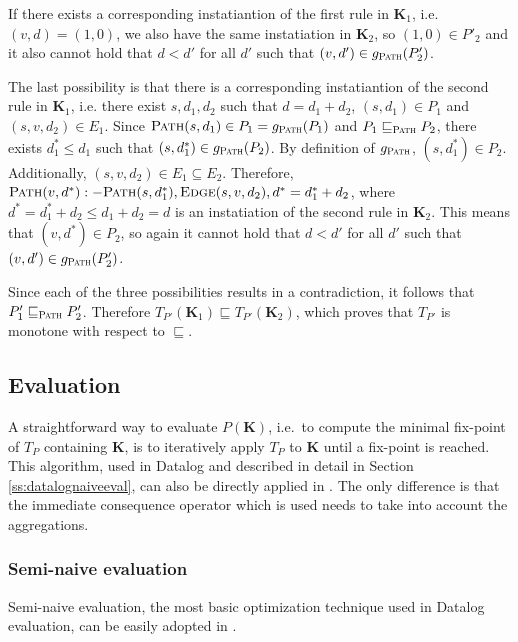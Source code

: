 \begin{exmp}
\begin{prof}
If there exists a corresponding instatiantion of the first rule in $\textbf{K}_1$, i.e. $(v, d) = (1, 0)$, we also have the same instatiation in $\textbf{K}_2$, so $(1, 0) \in P'_2$ and it also cannot hold that $d < d'$ for all $d'$ such that $(v, d') \in g_\textsc{Path}(P'_2)$.

The last possibility is that there is a corresponding instatiantion of the second rule in $\textbf{K}_1$, i.e. there exist $s, d_1, d_2$ such that $d = d_1 + d_2$, $(s, d_1) \in P_1$ and $(s, v, d_2) \in E_1$. Since $\textsc{Path}(s, d_1) \in P_1 = g_\textsc{Path}(P_1)$ and $P_1 \sqsubseteq_\textsc{Path} P_2$, there exists $d^*_1 \le d_1$ such that $(s, d^*_1) \in g_\textsc{Path}(P_2)$.  By definition of $g_\textsc{Path}$, $(s, d^*_1) \in P_2$. Additionally, $(s, v, d_2) \in E_1 \subseteq E_2$. Therefore, $\textsc{Path} (v, d^*) :- \textsc{Path} (s, d^*_1), \textsc{Edge} (s, v, d_2), d^* = d^*_1 + d_2$, where $d^* = d^*_1 + d_2 \le d_1 + d_2 = d$ is an instatiation of the second rule in $\textbf{K}_2$. This means that $(v, d^*) \in P_2$, so again it cannot hold that $d < d'$ for all $d'$ such that $(v, d') \in g_\textsc{Path}(P'_2)$. 

Since each of the three possibilities results in a contradiction, it follows that $P'_1 \sqsubseteq_\textsc{Path} P'_2$. Therefore $T_{P'}(\textbf{K}_1) \sqsubseteq T_{P'}(\textbf{K}_2)$, which proves that $T_{P'}$ is monotone with respect to $\sqsubseteq$.
\end{prof}
\end{exmp}

\subsection{Evaluation}
A straightforward way to evaluate $P(\textbf{K})$, i.e.\ to compute the minimal fix-point of $T_P$ containing $\textbf{K}$, is to iteratively apply $T_P$ to $\textbf{K}$ until a fix-point is reached. This algorithm, used in Datalog and described in detail in Section \ref{ss:datalognaiveeval}, can also be directly applied in \datalogra. The only difference is that the immediate consequence operator which is used needs to take into account the aggregations.

\subsubsection{Semi-naive evaluation} Semi-naive evaluation, the most basic optimization technique used in Datalog evaluation, can be easily adopted in \datalogra.

